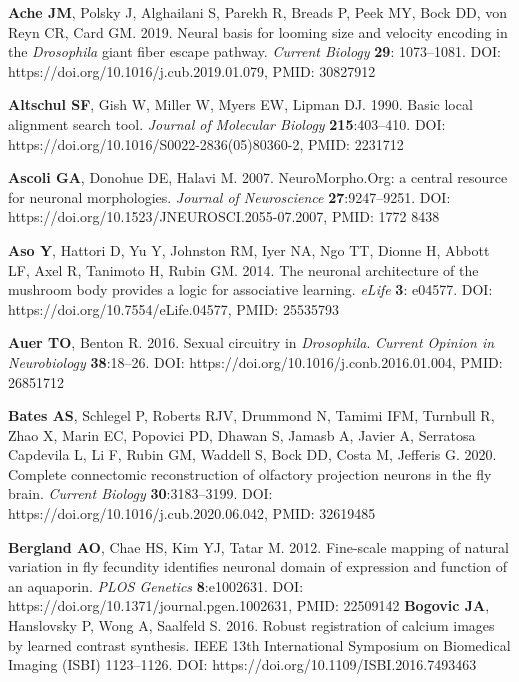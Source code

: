 \documentclass{article}
\begin{document}
\begin{hangpars}\small

\textbf{Ache JM}, Polsky J, Alghailani S, Parekh R, Breads P, Peek MY, Bock DD, von Reyn CR, Card GM. 2019. Neural basis for looming size and velocity encoding in the \emph{Drosophila} giant fiber escape pathway. \emph{Current Biology} \textbf{29}: 1073–1081. DOI: https://doi.org/10.1016/j.cub.2019.01.079, PMID: 30827912

\textbf{Altschul SF}, Gish W, Miller W, Myers EW, Lipman DJ. 1990. Basic local alignment search tool. \emph{Journal of} \emph{Molecular Biology} \textbf{215}:403–410. DOI: https://doi.org/10.1016/S0022-2836(05)80360-2, PMID: 2231712

\textbf{Ascoli GA}, Donohue DE, Halavi M. 2007. NeuroMorpho.Org: a central resource for neuronal morphologies. \emph{Journal of Neuroscience} \textbf{27}:9247–9251. DOI: https://doi.org/10.1523/JNEUROSCI.2055-07.2007, PMID: 1772 8438

\textbf{Aso Y}, Hattori D, Yu Y, Johnston RM, Iyer NA, Ngo TT, Dionne H, Abbott LF, Axel R, Tanimoto H, Rubin GM. 2014. The neuronal architecture of the mushroom body provides a logic for associative learning. \emph{eLife} \textbf{3}: e04577. DOI: https://doi.org/10.7554/eLife.04577, PMID: 25535793

\textbf{Auer TO}, Benton R. 2016. Sexual circuitry in \emph{Drosophila}. \emph{Current Opinion in Neurobiology} \textbf{38}:18–26. DOI: https://doi.org/10.1016/j.conb.2016.01.004, PMID: 26851712

\textbf{Bates AS}, Schlegel P, Roberts RJV, Drummond N, Tamimi IFM, Turnbull R, Zhao X, Marin EC, Popovici PD, Dhawan S, Jamasb A, Javier A, Serratosa Capdevila L, Li F, Rubin GM, Waddell S, Bock DD, Costa M, Jefferis G. 2020. Complete connectomic reconstruction of olfactory projection neurons in the fly brain. \emph{Current Biology} \textbf{30}:3183–3199. DOI: https://doi.org/10.1016/j.cub.2020.06.042, PMID: 32619485

\textbf{Bergland AO}, Chae HS, Kim YJ, Tatar M. 2012. Fine-scale mapping of natural variation in fly fecundity identifies neuronal domain of expression and function of an aquaporin. \emph{PLOS Genetics} \textbf{8}:e1002631. DOI: https://doi.org/10.1371/journal.pgen.1002631, PMID: 22509142 \textbf{Bogovic JA}, Hanslovsky P, Wong A, Saalfeld S. 2016. Robust registration of calcium images by learned contrast synthesis. IEEE 13th International Symposium on Biomedical Imaging (ISBI) 1123–1126. DOI: https://doi.org/10.1109/ISBI.2016.7493463


\end{hangpars}
\end{document}
